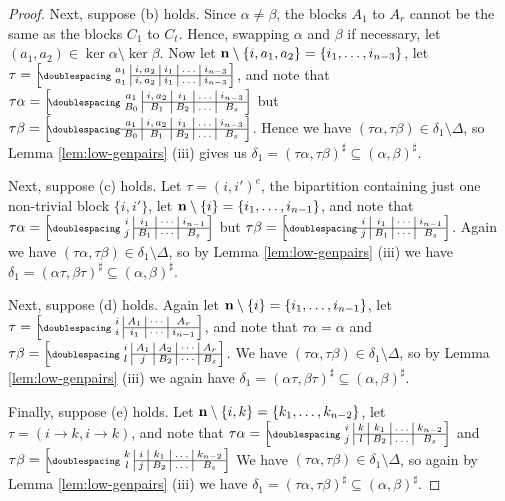\begin{lemma}
\begin{proof}
    Next, suppose (b) holds.
    Since $\alpha \neq \beta$, the blocks $A_1$ to $A_r$ cannot be the same as
    the blocks $C_1$ to $C_t$.  Hence, swapping $\alpha$ and $\beta$ if
    necessary, let $(a_1,a_2) \in \ker\alpha \setminus \ker\beta$.  Now let
    $\mathbf{n} \setminus \{i,a_1,a_2\} = \{i_1, \ldots, i_{n-3}\}$, let
    $\tau=\bipart{c|c|c|c|c}{2-5}
    {a_1 & i,a_2 & i_1 & \ldots & i_{n-3}}
    {a_1 & i,a_2 & i_1 & \ldots & i_{n-3}}$,
    and note that
    $\tau\alpha = \bipart{c|c|c|c|c}{2-5}
    {a_1 & i,a_2 & i_1 & \ldots & i_{n-3}}{B_0 & B_1 & B_2 & \ldots & B_s}$ but
    $\tau\beta = \bipart{c|c|c|c|c}{1-5}
    {a_1 & i,a_2 & i_1 & \ldots & i_{n-3}}{B_0 & B_1 & B_2 & \ldots & B_s}$.
    Hence we have $(\tau\alpha,\tau\beta) \in \delta_1 \setminus \Delta$, so
    Lemma \ref{lem:low-genpairs} (iii) gives us
    $\delta_1 = (\tau\alpha,\tau\beta)^\sharp \subseteq (\alpha,\beta)^\sharp$.

    Next, suppose (c) holds.  Let $\tau = (i,i')^e$, the
    bipartition containing just one non-trivial block $\{i,i'\}$, let
    $\mathbf{n} \setminus \{i\}=\{i_1,\ldots,i_{n-1}\}$, and note that
    $\tau\alpha = \bipart{c|c|c|c}{2-4}
    {i & i_1 & \cdots & i_{n-1}}{j & B_1 & \cdots & B_s}$ but
    $\tau\beta = \bipart{c|c|c|c}{1-4}
    {i & i_1 & \cdots & i_{n-1}}{j & B_1 & \cdots & B_s}$.
    Again we have $(\tau\alpha,\tau\beta) \in \delta_1 \setminus \Delta$, so by
    Lemma \ref{lem:low-genpairs} (iii) we have
    $\delta_1 = (\alpha\tau,\beta\tau)^\sharp \subseteq (\alpha,\beta)^\sharp$.

    Next, suppose (d) holds.
    Again let $\mathbf{n}\setminus\{i\}=\{i_1,\ldots,i_{n-1}\}$, let
    $\tau=\bipart{c|c|c|c}{2-4}
    {i & A_1 & \cdots & A_r}{i & i_1 & \cdots & i_{n-1}}$, and note that
    $\tau\alpha = \alpha $ and
    $\tau\beta = \bipart{c|c|c|c|c}{2-5}
    {i & A_1 & A_2 & \cdots & A_r}{l & j & B_2 & \cdots & B_s}$.
    We have $(\tau\alpha,\tau\beta) \in \delta_1 \setminus \Delta$, so by
    Lemma \ref{lem:low-genpairs} (iii) we again have
    $\delta_1=(\alpha\tau, \beta\tau)^\sharp\subseteq(\alpha,\beta)^\sharp$.

    Finally, suppose (e) holds.
    Let $\mathbf{n}\setminus\{i,k\}=\{k_1,\ldots,k_{n-2}\}$, let
    $\tau=(i \to k,i \to k)$, and note that
    $\tau\alpha=\bipart{c|c|c|c|c}{2-5}
    {i & k & k_1 & \ldots & k_{n-2}}
    {j & l & B_2 & \ldots & B_s}$
    and
    $\tau\beta=\bipart{c|c|c|c|c}{2-5}
    {k & i & k_1 & \ldots & k_{n-2}}
    {l & j & B_2 & \ldots & B_s}$
    We have $(\tau\alpha,\tau\beta) \in \delta_1 \setminus \Delta$, so again by
    Lemma \ref{lem:low-genpairs} (iii) we have
    $\delta_1 = (\tau\alpha, \tau\beta)^\sharp \subseteq (\alpha,\beta)^\sharp$.


\end{proof}
\end{lemma}
